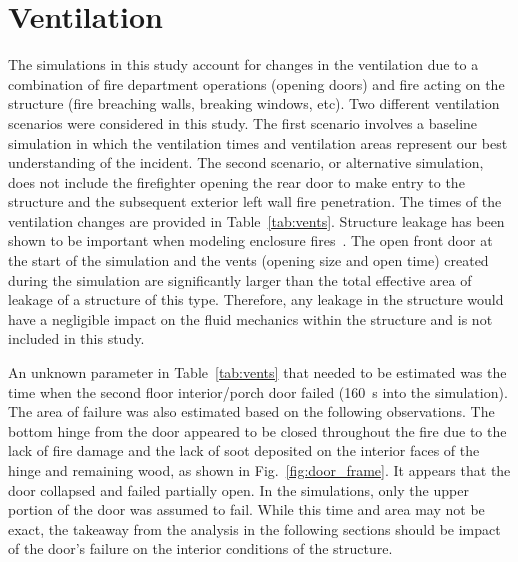 \documentclass[12pt,oneside]{book}
\begin{document}
\section{Ventilation}
\label{Vents}
The simulations in this study account for changes in the ventilation due to a combination of fire department operations (opening doors) and fire acting on the structure (fire breaching walls, breaking windows, etc). Two different ventilation scenarios were considered in this study. The first scenario involves a baseline simulation in which the ventilation times and ventilation areas represent our best understanding of the incident. The second scenario, or alternative simulation, does not include the firefighter opening the rear door to make entry to the structure and the subsequent exterior left wall fire penetration. The times of the ventilation changes are provided in Table~\ref{tab:vents}. Structure leakage has been shown to be important when modeling enclosure fires~\cite{beal2009}. The open front door at the start of the simulation and the vents (opening size and open time) created during the simulation are significantly larger than the total effective area of leakage of a structure of this type. Therefore, any leakage in the structure would have a negligible impact on the fluid mechanics within the structure and is not included in this study.

An unknown parameter in Table~\ref{tab:vents} that needed to be estimated was the time when the second floor interior/porch door failed (160~s into the simulation). The area of failure was also estimated based on the following observations. The bottom hinge from the door appeared to be closed throughout the fire due to the lack of fire damage and the lack of soot deposited on the interior faces of the hinge and remaining wood, as shown in Fig.~\ref{fig:door_frame}. It appears that the door collapsed and failed partially open. In the simulations, only the upper portion of the door was assumed to fail. While this time and area may not be exact, the takeaway from the analysis in the following sections should be impact of the door's failure on the interior conditions of the structure.

\clearpage
\end{document}
